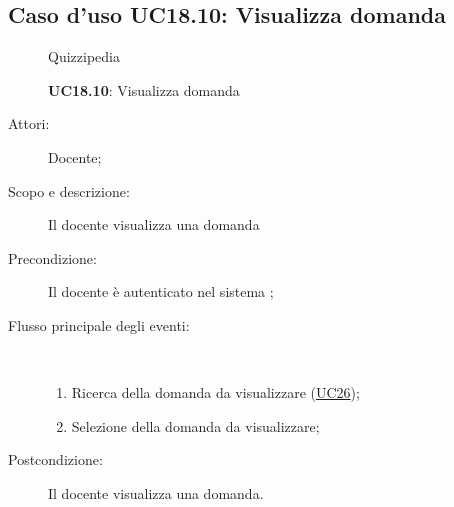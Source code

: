 \subsection{Caso d'uso UC18.10: Visualizza domanda}
	\begin{figure}[H]
		\centering
		\begin{resizedtikzpicture}{\textwidth}
		\begin{umlsystem}[x=0, fill=lightgray!20]{Quizzipedia}
		\end{umlsystem}
		\end{resizedtikzpicture}
		\caption{\textbf{UC18.10}: Visualizza domanda}
		\label{UC18.10}
	\end{figure}
\begin{description}
\item[Attori:] Docente;
\item[Scopo e descrizione:] Il docente visualizza una domanda
      \item[Precondizione:] Il docente è autenticato nel sistema
;

        \item[Flusso principale degli eventi:] \ 
 \begin{enumerate}
          \item Ricerca della domanda da visualizzare (\hyperlink{UC26}{UC26});
          \item Selezione della domanda da visualizzare;

      \end{enumerate}
    \item[Postcondizione:] Il docente visualizza una domanda.
  \end{description}
\hypertarget{UC18.11}{}
